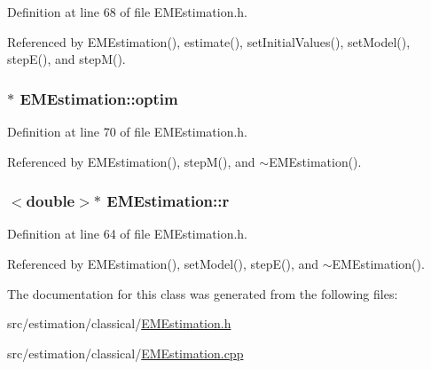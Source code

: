 Definition at line 68 of file E\+M\+Estimation.\+h.



Referenced by E\+M\+Estimation(), estimate(), set\+Initial\+Values(), set\+Model(), step\+E(), and step\+M().

\hypertarget{classEMEstimation_abbabf603bb09b6338114dd53aef5bd8a}{}
\subsubsection[{optim}]{$\ast$ E\+M\+Estimation\+::optim\hspace{0.3cm}{\ttfamily [private]}}\label{classEMEstimation_abbabf603bb09b6338114dd53aef5bd8a}


Definition at line 70 of file E\+M\+Estimation.\+h.



Referenced by E\+M\+Estimation(), step\+M(), and $\sim$\+E\+M\+Estimation().

\hypertarget{classEMEstimation_a426db380391c487206521631156d7eb6}{}
\subsubsection[{r}]{$<$double$>$$\ast$ E\+M\+Estimation\+::r\hspace{0.3cm}{\ttfamily [private]}}\label{classEMEstimation_a426db380391c487206521631156d7eb6}


Definition at line 64 of file E\+M\+Estimation.\+h.



Referenced by E\+M\+Estimation(), set\+Model(), step\+E(), and $\sim$\+E\+M\+Estimation().



The documentation for this class was generated from the following files\+:\begin{DoxyCompactItemize}
\item 
src/estimation/classical/\hyperlink{EMEstimation_8h}{E\+M\+Estimation.\+h}\item 
src/estimation/classical/\hyperlink{EMEstimation_8cpp}{E\+M\+Estimation.\+cpp}\end{DoxyCompactItemize}
